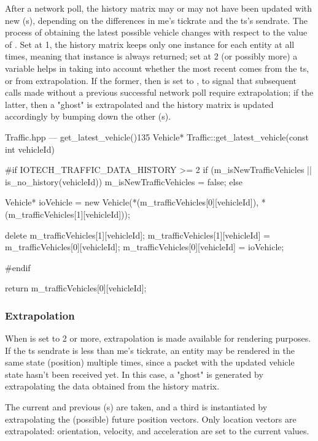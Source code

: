 After a network poll, the history matrix may or may not have been updated with new (s), depending on the differences in \gls{me}'s \gls{tickrate} and the \gls{ts}'s \gls{sendrate}. The process of obtaining the latest possible vehicle changes with respect to the value of . Set at \num{1}, the history matrix keeps only one instance for each entity at all times, meaning that instance is always returned; set at \num{2} (or possibly more) a  variable helps in taking into account whether the most recent  comes from the \gls{ts}, or from extrapolation. If the former, then  is set to , to signal that subsequent calls made without a previous successful network poll require extrapolation; if the latter, then a "ghost"  is extrapolated and the history matrix is updated accordingly by bumping down the other (s).

\begin{codelist}{Traffic.hpp --- get\_latest\_vehicle()}{135}
Vehicle* Traffic::get_latest_vehicle(const int vehicleId) {
#if IOTECH_TRAFFIC_DATA_HISTORY >= 2
    if (m_isNewTrafficVehicles || is_no_history(vehicleId)) {
        m_isNewTrafficVehicles = false;
    } else {
        Vehicle* ioVehicle = new Vehicle(*(m_trafficVehicles[0][vehicleId]), *(m_trafficVehicles[1][vehicleId]));

        delete m_trafficVehicles[1][vehicleId];
        m_trafficVehicles[1][vehicleId] = m_trafficVehicles[0][vehicleId];
        m_trafficVehicles[0][vehicleId] = ioVehicle;
    }
#endif

    return m_trafficVehicles[0][vehicleId];
}
\end{codelist}

\subsubsection{Extrapolation}

When  is set to \num{2} or more, extrapolation is made available for rendering purposes. If the \gls{ts} \gls{sendrate} is less than \gls{me}'s \gls{tickrate}, an entity may be rendered in the same state (position) multiple times, since a packet with the updated vehicle state hasn't been received yet. In this case, a "ghost"  is generated by extrapolating the data obtained from the history matrix.

The current and previous (s) are taken, and a third  is instantiated by extrapolating the (possible) future position vectors. Only location vectors are extrapolated: orientation, velocity, and acceleration are set to the current  values.

